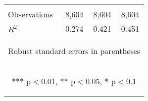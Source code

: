 \begin{center}
\begin{tabular}{lccc}
\vspace{4pt} & \begin{footnotesize}\end{footnotesize} & \begin{footnotesize}\end{footnotesize} & \begin{footnotesize}\end{footnotesize} \\
Observations & 8,604 & 8,604 & 8,604 \\
 $R^2$ & 0.274 & 0.421 & 0.451 \\ \hline
\multicolumn{4}{c}{\begin{footnotesize} Robust standard errors in parentheses\end{footnotesize}} \\
\multicolumn{4}{c}{\begin{footnotesize} *** p$<$0.01, ** p$<$0.05, * p$<$0.1\end{footnotesize}} \\
\end{tabular}
\end{center}
